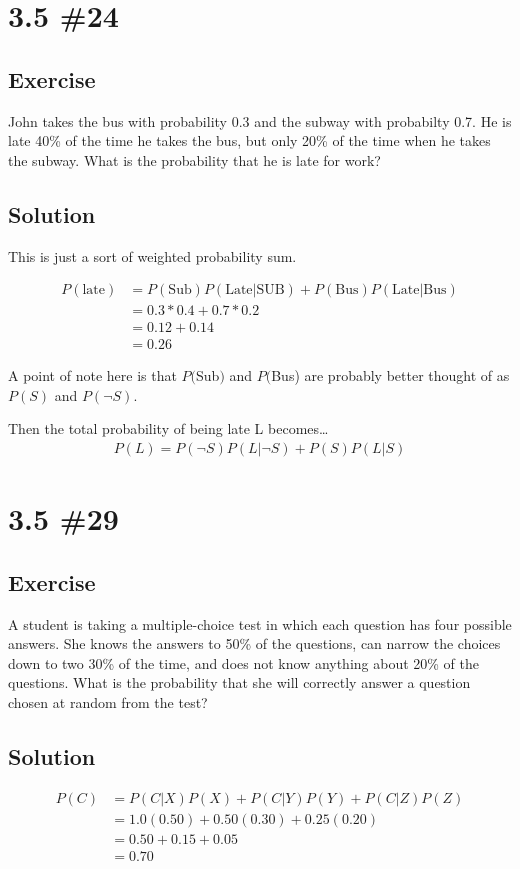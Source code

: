 \documentclass[12pt]{article}
\begin{document}
\section{3.5 \#24} 
\subsection{Exercise}
John takes the bus with probability 0.3 and the subway with probabilty 0.7. 
He is late 40\% of the time he takes the bus, but only 20\% of the time when he takes the subway. What is the
probability that he is late for work?

\subsection{Solution}
This is just a sort of weighted probability sum. 

\begin{align*}
  P(\text{late})&= P(\text{Sub})P(\text{Late}|\text{SUB}) + P(\text{Bus})P(\text{Late}|\text{Bus})\\
                &= 0.3*0.4 + 0.7*0.2\\
                &= 0.12 + 0.14\\
                &= 0.26
\end{align*}

A point of note here is that $P($Sub$)$ and $P($Bus) are probably better thought of as $P(S)$ and $P(\neg S)$.

Then the total probability of being late L becomes\ldots
\begin{align*}
  P(L)=P(\neg S)P(L|\neg S) + P(S)P(L|S)
\end{align*}


\section{3.5 \#29}
\subsection{Exercise}
A student is taking a multiple-choice test in which each question has four possible answers. She knows the answers to 50\% of the questions, can narrow the choices down to two 30\% of the time, and does not know anything about 20\% of the questions. What is the probability that she will correctly answer a question chosen at random from the test?

\subsection{Solution}
\begin{align*}
  P(C) &= P(C|X)P(X) + P(C|Y)P(Y) + P(C|Z)P(Z)\\
       &= 1.0(0.50) + 0.50(0.30) + 0.25(0.20)\\
       &= 0.50 + 0.15 + 0.05\\
       &= 0.70
\end{align*}
\end{document}
